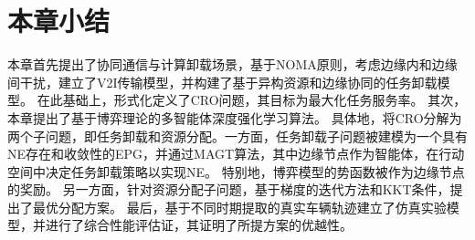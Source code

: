 \section{本章小结}\label{section 3-6}

本章首先提出了协同通信与计算卸载场景，基于NOMA原则，考虑边缘内和边缘间干扰，建立了V2I传输模型，并构建了基于异构资源和边缘协同的任务卸载模型。
在此基础上，形式化定义了CRO问题，其目标为最大化任务服务率。
其次，本章提出了基于博弈理论的多智能体深度强化学习算法。
具体地，将CRO分解为两个子问题，即任务卸载和资源分配。一方面，任务卸载子问题被建模为一个具有NE存在和收敛性的EPG，并通过MAGT算法，其中边缘节点作为智能体，在行动空间中决定任务卸载策略以实现NE。
特别地，博弈模型的势函数被作为边缘节点的奖励。
另一方面，针对资源分配子问题，基于梯度的迭代方法和KKT条件，提出了最优分配方案。
最后，基于不同时期提取的真实车辆轨迹建立了仿真实验模型，并进行了综合性能评估证，其证明了所提方案的优越性。
